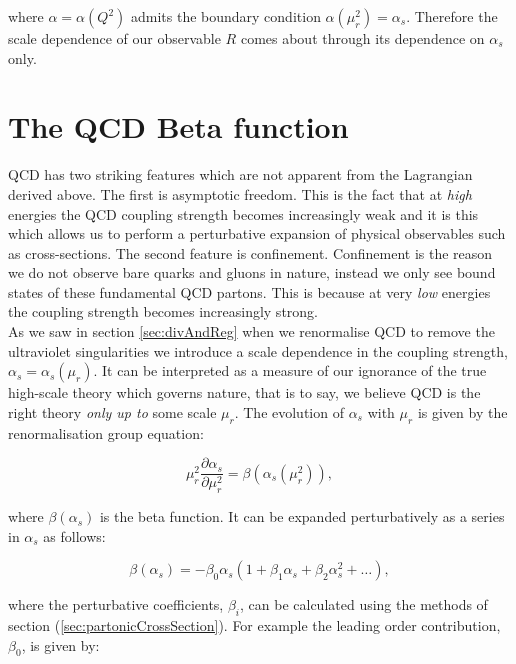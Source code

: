 		where $\alpha=\alpha(Q^2)$ admits the boundary condition $\alpha(\mu_r^2)=\alpha_s$.  Therefore the scale dependence
		of our observable $R$ comes about through its dependence on $\alpha_s$ only.

\section{The QCD Beta function}
	\label{sec:betaFunction}

	QCD has two striking features which are not apparent from the Lagrangian derived above.  The first is asymptotic freedom.
	This is the fact that at \emph{high} energies the QCD coupling strength becomes increasingly weak and it is this which allows us to
	perform a perturbative expansion of physical observables such as cross-sections.  The second feature is confinement.  Confinement
	is the reason we do not observe bare quarks and gluons in nature, instead we only see bound states of these fundamental QCD partons.
	This is because at very \emph{low} energies the coupling strength becomes increasingly strong.\\As we saw in section \ref{sec:divAndReg}
	when we renormalise QCD to remove the ultraviolet singularities we introduce a scale dependence in the coupling strength,
	$\alpha_s = \alpha_s(\mu_r)$.  It can be interpreted as a measure of our ignorance of the true high-scale theory which governs nature,
	that is to say, we believe QCD is the right theory \emph{only up to} some scale $\mu_r$.  The evolution of $\alpha_s$ with $\mu_r$ is
	given by the renormalisation group equation:

	\begin{equation}
		\mu_r^2\frac{\partial\alpha_s}{\partial \mu_r^2} = \beta(\alpha_s(\mu_r^2)),
		\label{eqn:RSFlow}
	\end{equation}

	where $\beta(\alpha_s)$ is the beta function.  It can be expanded perturbatively as a series in $\alpha_s$
	as follows:

	\begin{equation}
		\beta(\alpha_s) = -\beta_0\alpha_s\left(1 + \beta_1\alpha_s + \beta_2\alpha_s^2 + \ldots \right),
		\label{eqn:betaFunction}
	\end{equation}

	where the perturbative coefficients, $\beta_i$, can be calculated using the methods of section (\ref{sec:partonicCrossSection}).
	For example the leading order contribution, $\beta_0$, is given by:

